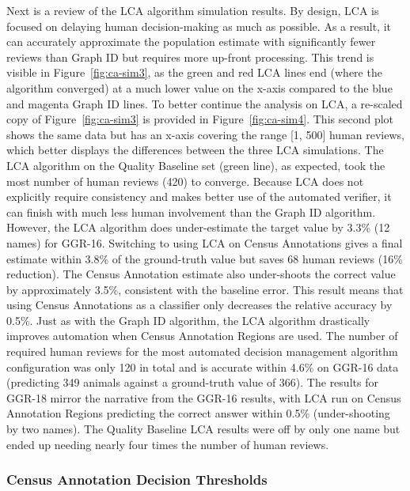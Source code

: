 Next is a review of the LCA algorithm simulation results.  By design, LCA is focused on delaying human decision-making as much as possible. As a result, it can accurately approximate the population estimate with significantly fewer reviews than Graph ID but requires more up-front processing.  This trend is visible in Figure~\ref{fig:ca-sim3}, as the green and red LCA lines end (where the algorithm converged) at a much lower value on the x-axis compared to the blue and magenta Graph ID lines.  To better continue the analysis on LCA, a re-scaled copy of Figure~\ref{fig:ca-sim3} is provided in Figure~\ref{fig:ca-sim4}.  This second plot shows the same data but has an x-axis covering the range [1, 500] human reviews, which better displays the differences between the three LCA simulations.  The LCA algorithm on the Quality Baseline set (green line), as expected, took the most number of human reviews (420) to converge.  Because LCA does not explicitly require consistency and makes better use of the automated verifier, it can finish with much less human involvement than the Graph ID algorithm.  However, the LCA algorithm does under-estimate the target value by 3.3\% (12 names) for GGR-16.  Switching to using LCA on Census Annotations gives a final estimate within 3.8\% of the ground-truth value but saves 68 human reviews (16\% reduction).  The Census Annotation estimate also under-shoots the correct value by approximately 3.5\%, consistent with the baseline error.  This result means that using Census Annotations as a classifier only decreases the relative accuracy by 0.5\%.  Just as with the Graph ID algorithm, the LCA algorithm drastically improves automation when Census Annotation Regions are used.  The number of required human reviews for the most automated decision management algorithm configuration was only 120 in total and is accurate within 4.6\% on GGR-16 data (predicting 349 animals against a ground-truth value of 366).  The results for GGR-18 mirror the narrative from the GGR-16 results, with LCA run on Census Annotation Regions predicting the correct answer within 0.5\% (under-shooting by two names).  The Quality Baseline LCA results were off by only one name but ended up needing nearly four times the number of human reviews.

\subsubsection{Census Annotation Decision Thresholds}

